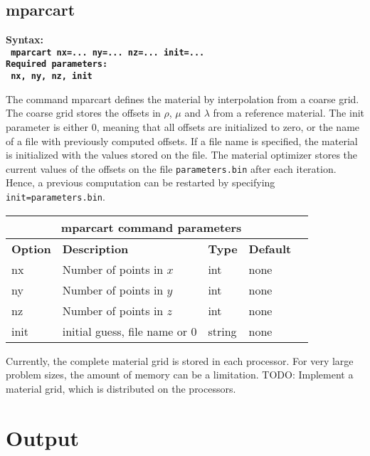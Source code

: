 \documentclass[12pt]{report}
\begin{document}
\subsection{mparcart}\label{sec:mparcart}
\begin{flushleft}\bf
Syntax:\\
\tt
mparcart nx=... ny=... nz=... init=...
\\
\bf Required parameters:\\
\tt
nx, ny, nz, init
\end{flushleft}
%
The command mparcart defines the material by interpolation from a coarse grid.
The coarse grid stores the offsets in $\rho$, $\mu$ and $\lambda$ from a reference material.
The init parameter is either 0, meaning that all offsets are initialized to zero, or the
name of a file with previously computed offsets. If a file name is specified, the material is
initialized with the values stored on the file. The material optimizer stores the current values
of the offsets on the file {\tt parameters.bin} after each iteration. Hence, a previous
computation can be restarted by specifying \verb+init=parameters.bin+.
\begin{center}
\begin{tabular}{|l|p{8cm}|l|l|l|} \hline
\multicolumn{4}{|c|}{\bf mparcart command parameters}\\ \hline
{\bf Option} & {\bf Description}          & {\bf Type} & {\bf Default} \\ \hline 
\hline
nx          & Number of points in $x$   & int    & none \\ \hline
ny          & Number of points in $y$   & int    & none \\ \hline
nz          & Number of points in $z$   & int    & none \\ \hline
init        & initial guess, file name or 0 & string & none \\ \hline
\end{tabular}
\end{center}

Currently, the complete material grid is stored in each processor. For very large problem sizes, the amount 
of memory can be a limitation. TODO: Implement a material grid, which is distributed on the processors.

\section{Output}
\end{document}

